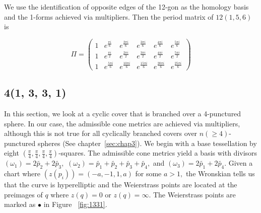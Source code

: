 \documentclass[12pt,reqno]{amsart}
\DeclareMathOperator{\Aut}{Aut}
\theoremstyle{definition}
\theoremstyle{remark}
\newtheorem*{remark}{Remark}
\begin{document}


We use the identification of opposite edges of the 12-gon as the homology basis and the 1-forms achieved via multipliers. Then the period matrix of $12(1, 5, 6)$ is

$$\Pi = \begin{pmatrix}1 & e^{\frac{\pi i}{6}} & e^{\frac{2 \pi i}{6}} & e^{\frac{3 \pi i}{6}} & e^{\frac{4 \pi i}{6}} & e^{\frac{5 \pi i}{6}}\\
1 & e^{\frac{\pi i}{2}} & e^{\frac{2 \pi i}{2}} & e^{\frac{3 \pi i}{2}} & e^{\frac{4 \pi i}{2}} & e^{\frac{5 \pi i}{2}}\\
1 & e^{\frac{5 \pi i}{6}} & e^{\frac{10 \pi i}{6}} & e^{\frac{15 \pi i}{6}} & e^{\frac{20 \pi i}{6}} & e^{\frac{25 \pi i}{6}}\end{pmatrix}$$


\subsection*{4(1, 3, 3, 1)}

In this section, we look at a cyclic cover that is branched over a 4-punctured sphere. In our case, the admissible cone metrics are achieved via multipliers, although this is not true for all cyclically branched covers over $n (\geq 4)$-punctured spheres (See chapter~\ref{sec:chap3}). We begin with a base tessellation by eight $(\frac{\pi}{4}, \frac{\pi}{4}, \frac{\pi}{4}, \frac{\pi}{4})$-squares. The admissible cone metrics yield a basis with divisors $(\omega_1) = 2 \widetilde{p_2} + 2 \widetilde{p_3},$ $(\omega_2) = \widetilde{p_1} + \widetilde{p_2} + \widetilde{p_3} + \widetilde{p_4},$ and $(\omega_3) = 2 \widetilde{p_1} + 2 \widetilde{p_4}.$ Given a chart where $(z(p_i)) = (-a, -1, 1, a)$ for some $a > 1,$ the Wronskian tells us that the curve is hyperelliptic and the Weierstrass points are located at the preimages of $q$ where $z(q) = 0$ or $z(q) = \infty.$ The Weierstrass points are marked as $\bullet$ in Figure~ \cref{fig:1331}.
\end{document}
